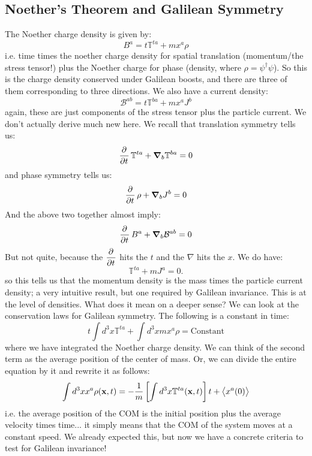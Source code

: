 \subsection{Noether's Theorem and Galilean Symmetry}
The Noether charge density is given by:
\begin{equation}
    B^a = t\mathbb{T}^{ta} + mx^a\rho
\end{equation}
i.e. time times the noether charge density for spatial translation (momentum/the stress tensor!) plus the Noether charge for phase (density, where $\rho = \psi^\dag\psi$). So this is the charge density conserved under Galilean boosts, and there are three of them corresponding to three directions. We also have a current density:
\begin{equation}
    \mathcal{B}^{ab} = t\mathbb{T}^{ba} + mx^aJ^b
\end{equation}
again, these are just components of the stress tensor plus the particle current. We don't actually derive much new here. We recall that translation symmetry tells us:
\begin{equation}
    \dpd{}{t}\mathbb{T}^{ta} + \nabla_b \mathbb{T}^{ba} = 0
\end{equation}
and phase symmetry tells us:
\begin{equation}
    \dpd{}{t}\rho + \nabla_b J^b = 0
\end{equation}
And the above two together almost imply:
\begin{equation}
    \dpd{}{t}B^a + \nabla_b \mathcal{B}^{ab} = 0
\end{equation}
But not quite, because the $\dpd{}{t}$ hits the $t$ and the $\nabla$ hits the $x$. We do have:
\begin{equation}
    \mathbb{T}^{ta} + mJ^a = 0.
\end{equation}
so this tells us that the momentum density is the mass times the particle current density; a very intuitive result, but one required by Galilean invariance. This is at the level of densities. What does it mean on a deeper sense? We can look at the conservation laws for Galilean symmetry. The following is a constant in time:
\begin{equation}
    t \int d^3x\mathbb{T}^{ta} + \int d^3x mx^a\rho = \text{Constant}
\end{equation}
where we have integrated the Noether charge density. We can think of the second term as the average position of the center of mass. Or, we can divide the entire equation by it and rewrite it as follows:
\begin{equation}
    \int d^3x x^a \rho(\mathbf{x}, t) = -\frac{1}{m}
\left[\int d^3x \mathbb{T}^{ta}(\mathbf{x}, t)\right]t + \left< x^a(0) \right>
\end{equation}
i.e. the average position of the COM is the initial position plus the average velocity times time... it simply means that the COM of the system moves at a constant speed. We already expected this, but now we have a concrete criteria to test for Galilean invariance!

